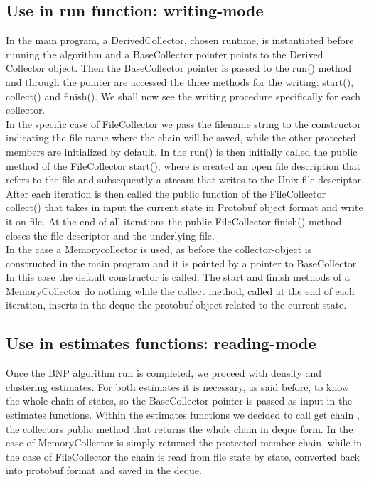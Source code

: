 \subsection{Use in run function: writing-mode}
In the main program, a DerivedCollector, chosen runtime, is instantiated before running the algorithm and a BaseCollector pointer points to the Derived Collector object.
Then the BaseCollector pointer is passed to the run() method and through the pointer are accessed the three methods for the writing: start(), collect() and finish().
We shall now see the writing procedure specifically for each collector. \\
In the specific case of FileCollector we pass the filename string to the constructor indicating the file name where the chain will be saved, while the other protected members are initialized by default. In the run() is then initially called the public method of the FileCollector start(), where is created an open file description that refers to the file and subsequently a stream that writes to the Unix file descriptor. After each iteration is then called the public function of the FileCollector collect() that takes in input the current state in Protobuf object format and write it on file. At the end of all iterations the public FileCollector finish() method closes the file descriptor and the underlying file. \\
In the case a Memorycollector is used, as before the collector-object is constructed in the main program and it is pointed by a pointer to BaseCollector. In this case the default constructor is called. The start and finish methods of a MemoryCollector do nothing while the collect method, called at the end of each iteration, inserts in the deque the protobuf object related to the current state.

\subsection{Use in estimates functions: reading-mode}
Once the BNP algorithm run is completed, we proceed with density and clustering estimates. For both estimates it is necessary, as said before, to know the whole chain of states, so the BaseCollector pointer is passed as input in the estimates functions. Within the estimates functions we decided to call get chain , the collectors public method that returns the whole chain in deque form. In the case of MemoryCollector is simply returned the protected member chain, while in the case of FileCollector the chain is read from file state by state, converted back into protobuf format and saved in the deque.

